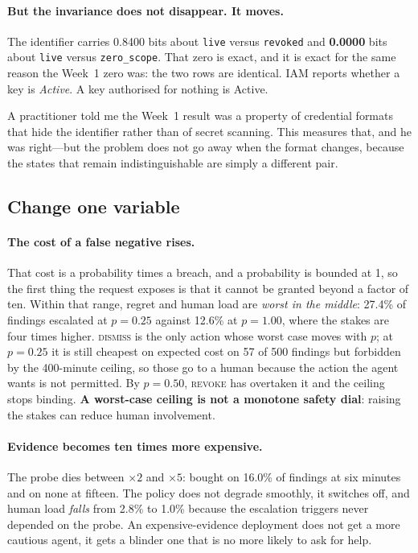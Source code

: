 \documentclass{article}
\begin{document}
\paragraph{But the invariance does not disappear. It moves.} The identifier
carries 0.8400 bits about \texttt{live} versus \texttt{revoked} and
\textbf{0.0000} bits about \texttt{live} versus \texttt{zero\_scope}. That zero is
exact, and it is exact for the same reason the Week~1 zero was: the two rows are
identical. IAM reports whether a key is \emph{Active}. A key authorised for
nothing is Active.

A practitioner told me the Week~1 result was a property of credential formats
that hide the identifier rather than of secret scanning. This measures that, and
he was right---but the problem does not go away when the format changes, because
the states that remain indistinguishable are simply a different pair.

\subsection{Change one variable}

\paragraph{The cost of a false negative rises.} That cost is a probability times a
breach, and a probability is bounded at 1, so the first thing the request exposes
is that it cannot be granted beyond a factor of ten. Within that range, regret
and human load are \emph{worst in the middle}: 27.4\% of findings escalated at
$p = 0.25$ against 12.6\% at $p = 1.00$, where the stakes are four times higher.
\textsc{dismiss} is the only action whose worst case moves with $p$; at $p =
0.25$ it is still cheapest on expected cost on 57 of 500 findings but forbidden
by the 400-minute ceiling, so those go to a human because the action the agent
wants is not permitted. By $p = 0.50$, \textsc{revoke} has overtaken it and the
ceiling stops binding. \textbf{A worst-case ceiling is not a monotone safety
dial}: raising the stakes can reduce human involvement.

\paragraph{Evidence becomes ten times more expensive.} The probe dies between
$\times 2$ and $\times 5$: bought on 16.0\% of findings at six minutes and on
none at fifteen. The policy does not degrade smoothly, it switches off, and human
load \emph{falls} from 2.8\% to 1.0\% because the escalation triggers never
depended on the probe. An expensive-evidence deployment does not get a more
cautious agent, it gets a blinder one that is no more likely to ask for help.
\end{document}
